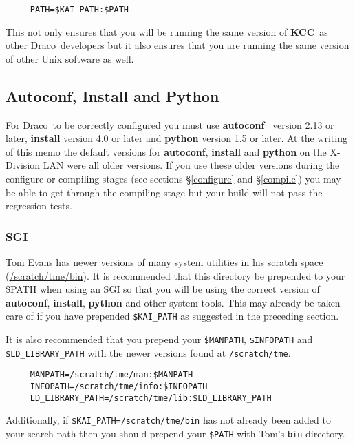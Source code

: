 \documentclass[10pt]{nmemo}
\newcommand{\comp}[1]{\normalfont\normalsize\texttt{#1}}
\newcommand{\draco}{{\normalfont\sffamily Draco}}
\newcommand{\kcc}{{\normalfont\bfseries KCC}}
\begin{document}
\footnotesize
\begin{verbatim}
     PATH=$KAI_PATH:$PATH
\end{verbatim}
\normalsize

This not only ensures that you will be running the same version of
\kcc\ as other \draco\ developers but it also ensures that you are
running the same version of other Unix software as well.

\subsection{Autoconf, Install and Python}

For \draco\ to be correctly configured you must use
\textbf{autoconf}~\cite{autoconf} version 2.13 or later, \textbf{install}
version 4.0 or later and \textbf{python} version 1.5 or later.  At the
writing of this memo the default versions for \textbf{autoconf},
\textbf{install} and \textbf{python} on the X-Division LAN were all older
versions.  If you use these older versions during the configure or
compiling stages (see sections \S\ref{configure} and \S\ref{compile})
you may be able to get through the compiling stage but your build will
not pass the regression tests.  

\subsubsection{SGI}

Tom Evans has newer versions of many system utilities in his scratch
space (\url{/scratch/tme/bin}).  It is recommended that this
directory be prepended to your \$PATH when using an SGI so that you
will be using the correct version of \textbf{autoconf},
\textbf{install}, \textbf{python} and other system tools.  This may
already be taken care of if you have prepended \comp{\$KAI\_PATH} as
suggested in the preceding section.

It is also recommended that you prepend your \comp{\$MANPATH},
\comp{\$INFOPATH} and \comp{\$LD\_LIBRARY\_PATH} with the newer
versions found at \comp{/scratch/tme}.

\footnotesize
\begin{verbatim}
     MANPATH=/scratch/tme/man:$MANPATH
     INFOPATH=/scratch/tme/info:$INFOPATH
     LD_LIBRARY_PATH=/scratch/tme/lib:$LD_LIBRARY_PATH
\end{verbatim} %
\normalsize

Additionally, if \comp{\$KAI\_PATH=/scratch/tme/bin} has not already
been added to your search path then you should prepend your
\comp{\$PATH} with Tom's \comp{bin} directory.
\end{document}
